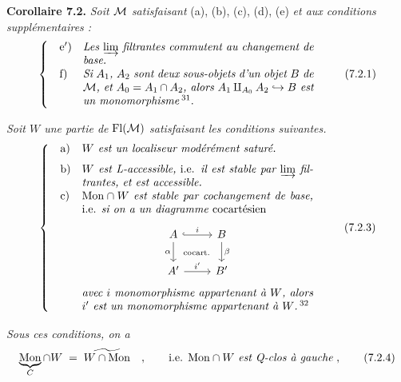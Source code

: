 \textbf{Corollaire 7.2.} \textit{Soit $\mathcal{M}$ satisfaisant} (a), (b), (c), (d), (e) \textit{et aux conditions supplémentaires :}
\[
\left\{
\begin{array}{@{\quad}l@{\quad}p{0.6\textwidth}}
\text{e$'$)} & \textit{Les $\varinjlim$ filtrantes commutent au changement de base.} \\[1.5ex]
\text{f)} & \textit{Si $A_1$, $A_2$ sont deux sous-objets d'un objet $B$ de $\M$, et $A_0 = A_1 \cap A_2$, alors $A_1 \amalg_{A_0} A_2 \hookrightarrow B$ est un monomorphisme}\,\footnotemark[31].
\end{array}
\right.
\tag*{(7.2.1)}
\]

\textit{Soit $W$ une partie de} $\mathrm{Fl}(\mathcal{M})$ \textit{satisfaisant les conditions suivantes.}
\[
\left\{
\begin{array}{@{\quad}l@{\quad}p{0.6\textwidth}}
\text{a)} & \textit{$W$ est un localiseur modérément saturé.} \\[1.5ex]
\text{b)} & \textit{$W$ est L-accessible,} i.e. \textit{il est stable par $\varinjlim$ filtrantes, et est accessible.} \\[1.5ex]
\text{c)} & $\Mon \cap W$ \textit{est stable par cochangement de base,} i.e. \textit{si on a un diagramme} cocartésien
\begin{center}
\begin{tikzcd}[ampersand replacement=\&]
A \arrow[r, hook, "i"] \arrow[d, "\alpha"'] \arrow[dr, phantom, "\scriptstyle\text{cocart.}"] \& B \arrow[d, "\beta"] \\
A' \arrow[r, "i'"] \& B'
\end{tikzcd}
\end{center}
\textit{avec $i$ monomorphisme appartenant à $W$, alors $i'$ est un monomorphisme appartenant à $W$.}\,\footnotemark[32]
\end{array}
\right.
\tag*{(7.2.3)}
\]

\textit{Sous ces conditions, on a}
\[
\underbrace{\mathrm{Mon}}_{C} \cap W \;=\; \widetilde{W \cap \mathrm{Mon}} \quad , \qquad \text{i.e. } \mathrm{Mon} \cap W \text{ \textit{est Q-clos à gauche}} \;,
\tag*{(7.2.4)}
\]

